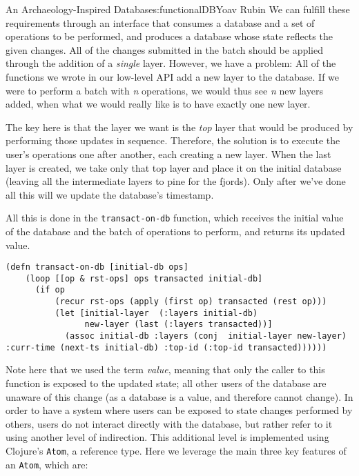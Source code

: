 \begin{aosachapter}{An Archaeology-Inspired Database}{s:functionalDB}{Yoav Rubin}
We can fulfill these requirements through an interface that consumes a
database and a set of operations to be performed, and produces a
database whose state reflects the given changes. All of the changes
submitted in the batch should be applied through the addition of a
\emph{single} layer. However, we have a problem: All of the functions we
wrote in our low-level API add a new layer to the database. If we were
to perform a batch with \emph{n} operations, we would thus see \emph{n}
new layers added, when what we would really like is to have exactly one
new layer.

The key here is that the layer we want is the \emph{top} layer that
would be produced by performing those updates in sequence. Therefore,
the solution is to execute the user's operations one after another, each
creating a new layer. When the last layer is created, we take only that
top layer and place it on the initial database (leaving all the
intermediate layers to pine for the fjords). Only after we've done all
this will we update the database's timestamp.

All this is done in the \texttt{transact-on-db} function, which receives
the initial value of the database and the batch of operations to
perform, and returns its updated value.

\begin{verbatim}
(defn transact-on-db [initial-db ops]
    (loop [[op & rst-ops] ops transacted initial-db]
      (if op
          (recur rst-ops (apply (first op) transacted (rest op)))
          (let [initial-layer  (:layers initial-db)
                new-layer (last (:layers transacted))]
            (assoc initial-db :layers (conj  initial-layer new-layer) :curr-time (next-ts initial-db) :top-id (:top-id transacted))))))
\end{verbatim}

Note here that we used the term \emph{value}, meaning that only the
caller to this function is exposed to the updated state; all other users
of the database are unaware of this change (as a database is a value,
and therefore cannot change). In order to have a system where users can
be exposed to state changes performed by others, users do not interact
directly with the database, but rather refer to it using another level
of indirection. This additional level is implemented using Clojure's
\texttt{Atom}, a reference type. Here we leverage the main three key
features of an \texttt{Atom}, which are:

\begin{aosaenumerate}
\def\labelenumi{\arabic{enumi}.}


\end{aosaenumerate}
\end{aosachapter}
